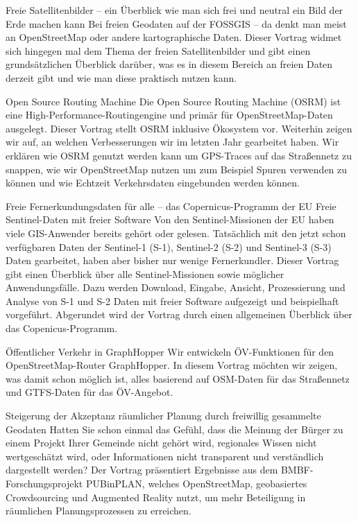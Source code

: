\renewcommand{\konferenztag}{\freitag}
%
{Freie Satellitenbilder – ein Überblick}%
{wie man sich frei und neutral ein Bild der Erde machen kann}%
{Bei freien Geodaten auf der FOSSGIS -- da denkt man meist an OpenStreetMap oder andere
kartographische Daten. Dieser Vortrag widmet sich hingegen mal dem Thema der freien Satellitenbilder
und gibt einen grundsätzlichen Überblick darüber, was es in diesem Bereich an freien Daten derzeit
gibt und wie man diese praktisch nutzen kann.}


%
{Open Source Routing Machine}%
{}
{Die Open Source Routing Machine (OSRM) ist eine High-Performance-Routingengine und primär für
  OpenStreetMap-Daten ausgelegt. Dieser Vortrag stellt OSRM inklusive Ökosystem vor. Weiterhin
  zeigen wir auf, an welchen Verbesserungen wir im letzten Jahr gearbeitet haben. Wir erklären wie
  OSRM genutzt werden kann um GPS-Traces auf das Straßennetz zu snappen, wie wir OpenStreetMap
  nutzen um zum Beispiel Spuren verwenden zu können und wie Echtzeit Verkehrsdaten eingebunden
werden können.}

%
{Freie Fernerkundungsdaten für alle – das Copernicus-Programm der EU}%
{Freie Sentinel-Daten mit freier Software}%
{Von den Sentinel-Missionen der EU haben viele GIS-Anwender bereits gehört oder gelesen. Tatsächlich
mit den jetzt schon verfügbaren Daten der Sentinel-1 (S-1), Sentinel-2 (S-2) und Sentinel-3 (S-3)
Daten gearbeitet, haben aber bisher nur wenige Fernerkundler. Dieser Vortrag gibt einen Überblick
über alle Sentinel-Missionen sowie möglicher Anwendungsfälle. Dazu werden Download, Eingabe,
Ansicht, Prozessierung und Analyse von S-1 und S-2 Daten mit freier Software aufgezeigt und
beispielhaft vorgeführt. Abgerundet wird der Vortrag durch einen allgemeinen Überblick über das
Copenicus-Programm.}



%
{Öffentlicher Verkehr in GraphHopper}%
{}%
{Wir entwickeln ÖV-Funktionen für den OpenStreetMap-Router GraphHopper. In diesem Vortrag möchten
wir zeigen, was damit schon möglich ist, alles basierend auf OSM-Daten für das Straßennetz und
GTFS-Daten für das ÖV-Angebot.}

%
{Steigerung der Akzeptanz räumlicher Planung durch freiwillig gesammelte Geodaten}%
{}%
{Hatten Sie schon einmal das Gefühl, dass die Meinung der Bürger zu einem Projekt Ihrer Gemeinde
nicht gehört wird, regionales Wissen nicht wertgeschätzt wird, oder Informationen nicht transparent
und verständlich dargestellt werden? Der Vortrag präsentiert Ergebnisse aus dem
BMBF-Forschungsprojekt PUBinPLAN, welches OpenStreetMap, geobasiertes Crowdsourcing und Augmented
Reality nutzt, um mehr Beteiligung in räumlichen Planungsprozessen zu erreichen. }

